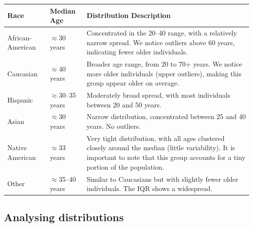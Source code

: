 \documentclass[conference]{IEEEtran}
\begin{document}
	\begin{table}[H]
		\centering
		\begin{tabular}{|l|l|p{4cm}|}
			\hline
			Race & Median Age & Distribution Description \\ \hline \hline
			African-American & $\approx$30 years & Concentrated in the 20–40 range, with a relatively narrow spread. We notice outliers above 60 years,  indicating fewer older individuals. \\ \hline
			Caucasian & $\approx$40 years & Broader age range, from 20 to 70+ years. We notice more older individuals (upper outliers), making this group appear older on average. \\ \hline
			Hispanic & $\approx$30–35 years & Moderately broad spread, with most individuals between 20 and 50 years. \\ \hline
			Asian & $\approx$30 years & Narrow distribution, concentrated between 25 and 40 years. No outliers. \\ \hline
			Native American & $\approx$33 years & Very tight distribution, with all ages clustered closely around the median (little variability). It is important to note that this group accounts for a tiny portion of the population. \\ \hline
			Other & $\approx$35–40 years & Similar to Caucasians but with slightly fewer older individuals. The IQR shows a widespread. \\ \hline
		\end{tabular}
	\end{table}



	\subsection{Analysing distributions}
\end{document}
